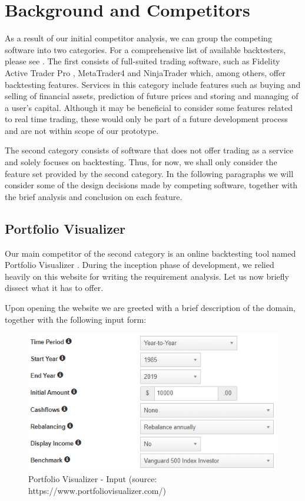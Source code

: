 \documentclass[main.tex]{subfiles}
\begin{document}
\section{Background and Competitors}
As a result of our initial competitor analysis, we can group the competing software into two categories. For a comprehensive list of available backtesters, please see \cite{listofbacktesters}. The first consists of full-suited trading software, such as Fidelity Active Trader Pro \cite{Fidelity}, MetaTrader4 \cite{MetaTrader} and NinjaTrader \cite{NinjaTrader} which, among others, offer backtesting features. Services in this category include features such as buying and selling of financial assets, prediction of future prices and storing and managing of a user's capital. Although it may be beneficial to consider some features related to real time trading, these would only be part of a future development process and are not within scope of our prototype.

The second category consists of software that does not offer trading as a service and solely focuses on backtesting. Thus, for now, we shall only consider the feature set provided by the second category. In the following paragraphs we will consider some of the design decisions made by competing software, together with the brief analysis and conclusion on each feature.

\subsection{Portfolio Visualizer}
Our main competitor of the second category is an online backtesting tool named Portfolio Visualizer \cite{portfoliovis}. During the inception phase of development, we relied heavily on this website for writing the requirement analysis. Let us now briefly dissect what it has to offer. 

Upon opening the website we are greeted with a brief description of the domain, together with the following input form:

\begin{figure}[H]
   \centering
   \includegraphics[scale=0.8]{02Background/02Pictures/portfolio_visualizer_input_1.png}
   \caption{Portfolio Visualizer - Input (source: https://www.portfoliovisualizer.com/)}
\end{figure}
\end{document}
